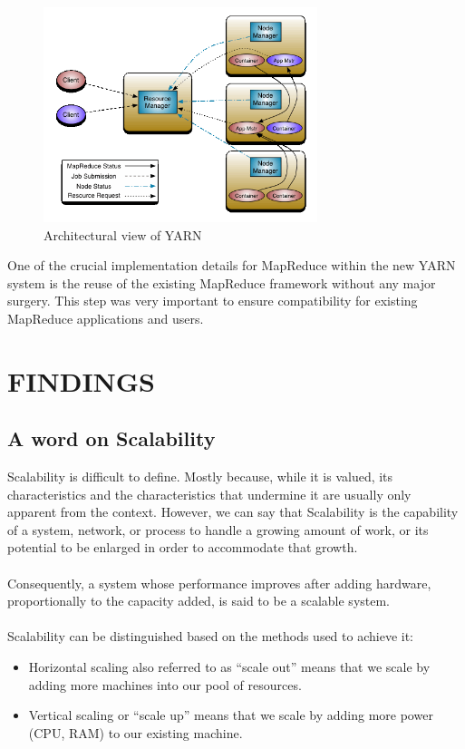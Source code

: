 \documentclass[a4paper,12pt,oneside]{report}
\begin{document}
\begin{enumerate}
                \begin{figure}[h!]
                        \centering
                        \includegraphics[width=80mm]{yarn}
                        \caption{Architectural view of YARN}
                \end{figure}

                One of the crucial implementation details for MapReduce within the new YARN system is the
                reuse of the existing MapReduce framework without any major surgery. This step was very
                important to ensure compatibility for existing MapReduce applications and users. 

\end{enumerate}
\newpage
\section{FINDINGS}

\subsection{A word on Scalability}

Scalability is difficult to define. \cite{Hill1990} Mostly because, while it is valued, its characteristics and
the characteristics that undermine it are usually only apparent from the context. However,
we can say that Scalability is the capability of a system, network, or process to handle a
growing amount of work, or its potential to be enlarged in order to accommodate that
growth. \cite{Bondi2000}\\
\\
Consequently, a system whose performance improves after adding hardware,
proportionally to the capacity added, is said to be a scalable system.\\
\\
Scalability can be distinguished based on the methods used to achieve it:
\begin{itemize}
        \item Horizontal scaling also referred to as “scale out” means that we scale by adding more
machines into our pool of resources.
\item Vertical scaling or “scale up” means that we scale by adding more power (CPU, RAM) to
our existing machine.
\end{itemize}
\end{document}
